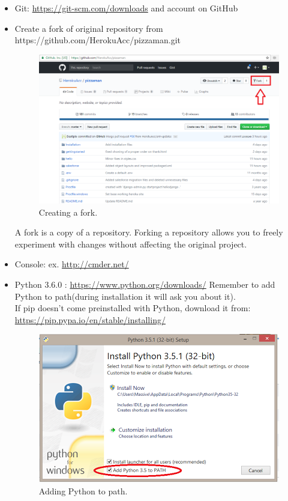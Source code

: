 \documentclass[12pt,a4paper]{article}
\begin{document}
\begin{itemize}
\item Git: \url{https://git-scm.com/downloads} and account on GitHub
\item Create a fork of original repository from \\
https://github.com/HerokuAcc/pizzaman.git\\

\begin{figure}[H]
	\centering
	\includegraphics[width = 1 \textwidth]{images/fork.PNG}
	\caption{Creating a fork.}
	\label{fig:fork}
\end{figure}
A fork is a copy of a repository. Forking a repository allows you to freely experiment with changes without affecting the original project.
\item Console: ex. \url{http://cmder.net/}
\item Python 3.6.0  : \url{https://www.python.org/downloads/}
Remember to add Python to path(during installation it will ask you about it).\\
If pip doesn't come preinstalled with Python, download it from: \url{https://pip.pypa.io/en/stable/installing/}\\

\begin{figure}[H]
	\centering
	\includegraphics{images/python.PNG}
	\caption{Adding Python to path.}
	\label{fig:path}
\end{figure}


\end{itemize}
\end{document}
